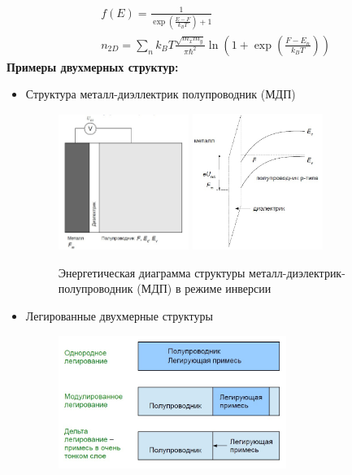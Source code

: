 $$
\begin{aligned}
& f(E)=\frac{1}{\exp \left(\frac{E-F}{k_{B} T}\right)+1} \\
& n_{2 D}=\sum_{n} k_{B} T \frac{\sqrt{m_{x} m_{y}}}{\pi \hbar^{2}} \ln \left(1+\exp \left(\frac{F-E_{n}}{k_{B} T}\right)\right)
\end{aligned}
$$
\textbf{Примеры двухмерных структур:}
\begin{itemize}
    \item Структура металл-диэллектрик полупроводник (МДП)
\begin{figure} [h!]
\centering
    \includegraphics[width=0.4\textwidth]{images/ph28.1.jpg}
    \includegraphics[width=0.4\textwidth]{images/ph28.2.jpg}
    \caption*{Энергетическая диаграмма структуры металл-диэлектрик-
полупроводник (МДП) в режиме инверсии}
\end{figure}
\item Легированные двухмерные структуры
\begin{figure} [h!]
\centering
    \includegraphics[width=0.7\textwidth]{images/ph28.3.jpg}
\end{figure}
\end{itemize}
